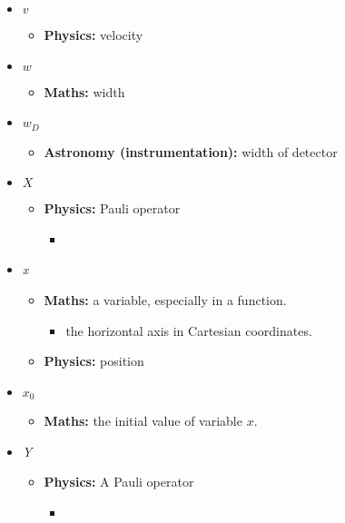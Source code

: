 \begin{itemize}
				\item $v$
				\begin{itemize}
					\item\textbf{Physics:} velocity
				\end{itemize}
				
				\item $w$
				\begin{itemize}
					\item\textbf{Maths:} width
				\end{itemize}
				
				\item $w_D$
				\begin{itemize}
					\item\textbf{Astronomy (instrumentation):} width of detector
				\end{itemize}
				
				\item $X$
				\begin{itemize}
					\item\textbf{Physics:} Pauli operator
					\begin{itemize}
						\item 
					\end{itemize}
				\end{itemize}
				
				\item \textit{x}
				\begin{itemize}
					\item\textbf{Maths:} a variable, especially in a function.
					\begin{itemize}
						\item the horizontal axis in Cartesian coordinates.
					\end{itemize}
					\item \textbf{Physics:} position
				\end{itemize}
				
				\item $x_0$
				\begin{itemize}
					\item\textbf{Maths:} the initial value of variable $x$.
				\end{itemize}
				
				\item \textit{Y}
				\begin{itemize}
					\item\textbf{Physics:} A Pauli operator
					\begin{itemize}
						\item 
					\end{itemize}
				\end{itemize}
				

\end{itemize}

